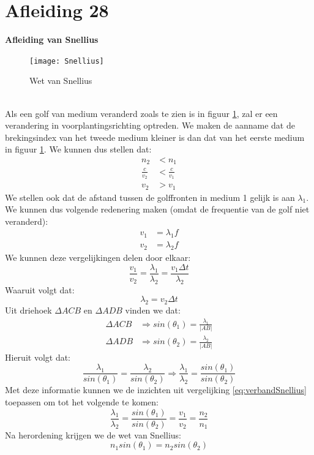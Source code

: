 \documentclass[a4paper,kul]{kulakarticle} %
\begin{document}
\section{Afleiding 28}
\textbf{Afleiding van Snellius}\\
\begin{figure}[!h]
	\centering
	\texttt{[image: Snellius]}
	\caption[Snellius]{Wet van Snellius}
	\label{fig:snellius}
\end{figure}\\
Als een golf van medium veranderd zoals te zien is in figuur \ref{fig:snellius}, zal er een verandering in voorplantingsrichting optreden. We maken de aanname dat de brekingsindex van het tweede medium kleiner is dan dat van het eerste medium in figuur \ref{fig:snellius}. We kunnen dus stellen dat:
\begin{align*}
	n_2&<n_1\\
	\frac{c}{v_2}&<\frac{c}{v_1}\\
	v_2&>v_1
\end{align*}
We stellen ook dat de afstand tussen de golffronten in medium 1 gelijk is aan $\lambda_1$. We kunnen dus volgende redenering maken (omdat de frequentie van de golf niet veranderd):
\begin{align*}
	v_1&=\lambda_1f\\
	v_2&=\lambda_2f
\end{align*}
We kunnen deze vergelijkingen delen door elkaar:
\begin{equation}
	\label{eq:verbandSnellius}
	\frac{v_1}{v_2}=\frac{\lambda_1}{\lambda_2}=\frac{v_1\Delta t}{\lambda_2}
\end{equation}
Waaruit volgt dat:
\begin{equation*}
	\lambda_2=v_2\Delta t
\end{equation*}
Uit driehoek $\Delta ACB$ en $\Delta ADB$ vinden we dat:
\begin{align*}
	\Delta ACB&\Rightarrow sin(\theta_1) = \frac{\lambda_1}{|AB|}\\
	\Delta ADB&\Rightarrow sin(\theta_2) = \frac{\lambda_2}{|AB|}
\end{align*}
Hieruit volgt dat:
\begin{equation*}
	\frac{\lambda_1}{sin(\theta_1)}= \frac{\lambda_2}{sin(\theta_2)} \Rightarrow \frac{\lambda_1}{\lambda_2}=\frac{sin(\theta_1)}{sin(\theta_2)}
\end{equation*}
Met deze informatie kunnen we de inzichten uit vergelijking \ref{eq:verbandSnellius} toepassen om tot het volgende te komen:
\begin{equation*}
	\frac{\lambda_1}{\lambda_2}=\frac{sin(\theta_1)}{sin(\theta_2)}=\frac{v_1}{v_2}= \frac{n_2}{n_1}
\end{equation*}
Na herordening krijgen we de wet van Snellius:
\begin{equation}
	n_1sin(\theta_1)=n_2sin(\theta_2)
\end{equation}
\newpage
\end{document}
